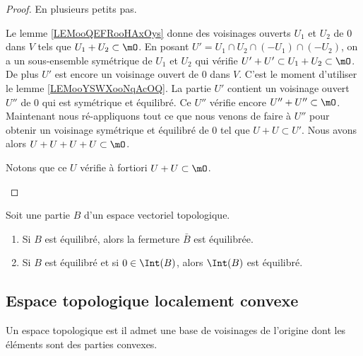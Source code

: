 \begin{proof}
	En plusieurs petits pas.
	\begin{subproof}
		Le lemme \ref{LEMooQEFRooHAxOys} donne des voisinages ouverts \( U_1\) et \( U_2\) de \( 0\) dans \( V\) tels que \( U_1+U_2\subset \mO\).
		\spitem[Symétrique]
		En posant \( U' = U_1 \cap U_2 \cap (-U_1) \cap (-U_2) \), on a un sous-ensemble symétrique de \( U_1\) et \(U_2\) qui vérifie \( U' + U'\subset U_1+U_2\subset \mO \). De plus \( U'\) est encore un voisinage ouvert de \( 0\) dans \( V\).
		\spitem[équilibré]
		C'est le moment d'utiliser le lemme \ref{LEMooYSWXooNqAcOQ}. La partie \( U'\) contient un voisinage ouvert \( U''\) de \( 0\) qui est symétrique et équilibré. Ce \( U''\) vérifie encore \( U''+U''\subset \mO\).
		\spitem[En \( 4\) parties]
		Maintenant nous ré-appliquons tout ce que nous venons de faire à \( U''\) pour obtenir un voisinage symétrique et équilibré de \( 0\) tel que \( U+U\subset U'\). Nous avons alors \( U+U+U+U\subset \mO\).

		Notons que ce \( U\) vérifie à fortiori \( U+U\subset \mO\).
	\end{subproof}
\end{proof}

\begin{lemma}	\label{LEMooKLOKooEfKhgN}
	Soit une partie \( B\) d'un espace vectoriel topologique.
	\begin{enumerate}
		\item
		      Si \( B\) est équilibré, alors la fermeture \( \bar B\) est équilibrée.
		\item		\label{ITEMooLZZEooAqoQVO}
		      Si \( B\) est équilibré et si \( 0\in\Int(B)\), alors \( \Int(B)\) est équilibré.
	\end{enumerate}
\end{lemma}

\ssdem


\subsection{Espace topologique localement convexe}

\begin{definition}  \label{DefPJokvAa}
	Un espace topologique est  il admet une base de voisinages de l'origine dont les éléments sont des parties convexes.
\end{definition}


